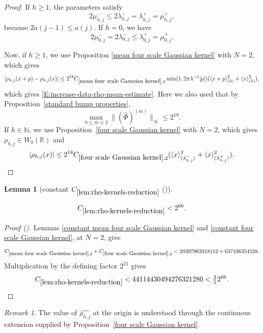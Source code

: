 \documentclass[12pt,reqno]{amsart}
\newcommand{\auto}{{({\tiny\faCar})}}
\theoremstyle{plain}
\newtheorem{lemma}[theorem]{Lemma}
\numberwithin{equation}{section}
\theoremstyle{remark}
\newtheorem{rem}{Remark}[section]
\newcommand{\uses}[1]{}
\newcommand{\usesdefs}[1]{}
\newcommand{\leanok}{}
\newcommand{\lean}[1]{}
\newcommand{\R}{{\mathbb R}}
\newcommand{\N}{{\mathbb N}}
\begin{document}
\begin{proof}
If \(h\geq1\), the parameters satisfy
\[
2\mu_{h,j}^-
\leq
2\lambda_{h,j}^-
=
\lambda_{h,j}^+
=
\mu_{h,j}^+,
\]
because \(2a(j-1)\leq a(j)\).
If $h=0$, we have
\[
2\mu_{0,j}^-
=
2\lambda_{0,j}^-
\leq
\lambda_{0,j}^+
=
\mu_{0,j}^+.
\]


Now, if $h\ge 1$, we  use Proposition
\ref{mean four scale Gaussian kernel}   with $N=2$, which  gives
\[|\rho_{h,j}(x+p)-\rho_{h,j}(x)| \le 2^{18} C_{\ref{mean four scale Gaussian kernel},2} \min(1,2\pi \lambda^{-1}|p|) (\langle x+p\rangle^2_{(\lambda)}+
\langle x\rangle^2_{(\lambda)}),
\]
which gives \eqref{E:increase-data-rho-mean-estimate}.
Here we also used that by Proposition~\ref{standard bump properties},
\[
\max_{0\leq m\leq2}
\|(\widehat\Phi)^{(m)}\|_\infty
\leq2^{18}.
\]
If $h\in \N$, we use  Proposition~\ref{four scale Gaussian kernel}   with $N=2$, which   gives $\rho_{h,j}\in W_0(\R)$ and
\[ |\rho_{h,j}(x)| \le 2^{18}C_{\ref{four scale Gaussian kernel},2} (\langle x\rangle^2_{(\lambda_{h,j}^-)} + \langle x\rangle^2_{(\lambda_{h,j}^+)}). \]
\end{proof}

\begin{lemma}[constant $C_{\ref{lem:rho-kernels-reduction}}$ \auto]\label{constant rho kernels reduction}\uses{lem:rho-kernels-reduction,constant mean four scale Gaussian kernel,constant four scale Gaussian kernel,mean four scale Gaussian kernel,four scale Gaussian kernel}\usesdefs{}
\lean{Auto.constantRhoKernelsReduction}
\leanok
\begin{equation}\label{constant rho kernels reduction bound}
C_{\ref{lem:rho-kernels-reduction}}
<2^{66}.
\end{equation}
\end{lemma}
\begin{proof}[Proof \auto]
Lemmas \ref{constant mean four scale Gaussian kernel} and \ref{constant four scale Gaussian kernel}, at $N=2$, give
\[
C_{\ref{mean four scale Gaussian kernel},2}
+C_{\ref{four scale Gaussian kernel},2}
<20397963318112+637436354528.
\]
Multiplication by the defining factor $2^{21}$ gives
\[
C_{\ref{lem:rho-kernels-reduction}}
<44114430494276321280<\tfrac35 2^{66}.
\]
\end{proof}


\begin{rem}
The value of $\widehat{\rho_{h,j}}$   at the origin is understood through the continuous
extension supplied by Proposition~\ref{four scale Gaussian kernel}.
\end{rem}
\end{document}
